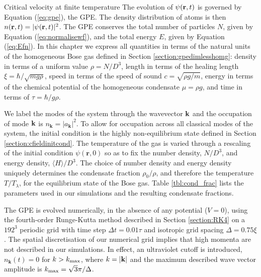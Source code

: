 \begin{chapter}{\label{cha:nonequib}Critical velocity at finite temperature}
The evolution of $\psi({\bf r},t)$ is governed by Equation (\ref{eq:gpe}), the GPE. The density distribution of atoms is then $n({\bf r},t)=|\psi({\bf r},t)|^2$.
The GPE conserves the total number of particles $N$, given by Equation (\ref{eq:normalisewf}), and the total energy $E$, given by Equation (\ref{eq:Efn}). In this chapter we express all quantities in terms of the natural units of the homogeneous Bose gas defined in Section \ref{section:gpedimlesshomg}:  density in terms of a uniform value $\rho = N/D^3$, length in terms of the healing length $\xi=\hbar/\sqrt{m g \rho}$, speed in terms of the speed of sound $c=\sqrt{\rho g/m}$, energy in terms of the chemical potential of the homogeneous condensate $\mu=\rho g$, and time in terms of $\tau=\hbar / g \rho$.

We label the modes of the system through the wavevector ${\bf k}$ and the occupation of mode ${\bf k}$ is $n_{\mathbf{k}}=|a_{\mathbf{k}}|^2$. To allow for occupation across all classical modes of the system, the initial condition is the highly non-equilibrium state defined in Section \ref{section:cfieldinitcond}.  The temperature of the gas is varied through a rescaling of the initial condition $\psi(\mathbf{r},0)$ so as to fix the number density, $N/D^3$, and energy density, $\langle H \rangle/D^3$. The choice of number density and energy density uniquely determines the condensate fraction $\rho_0/\rho$, and therefore the temperature $T/T_\lambda$, for the equilibrium state of the Bose gas. Table \ref{tbl:cond_frac} lists the parameters used in our simulations and the resulting condensate fractions.

The GPE is evolved numerically, in the absence of any potential ($V = 0$), using the fourth-order Runge-Kutta method described in Section \ref{section:RK4} on a $192^3$ periodic grid with time step $\Delta t =0.01 \tau$ and isotropic grid spacing $\Delta =0.75\xi$. The spatial discretisation of our numerical grid implies that high momenta are not described in our simulations. In effect, an ultraviolet cutoff is introduced, $n_{\mathbf{k}}(t)=0$ for $k>k_{\rm{max}}$, where $k=|{\bf k}|$ and the maximum described wave vector amplitude is $k_{\rm{max}} = \sqrt{3} \pi / \Delta$. 


\end{chapter}
